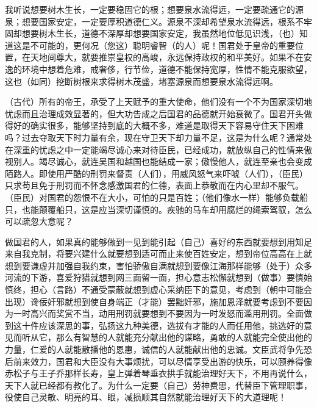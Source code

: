 \documentclass[12pt,UTF-8,openany]{ctexbook}
\begin{document}
\begin{normalsize}
    
    我听说想要树木生长，一定要稳固它的根；想要泉水流得远，一定要疏通它的源泉；想要国家安定，一定要厚积道德仁义。源泉不深却希望泉水流得远，根系不牢固却想要树木生长，道德不深厚却想要国家安定，我虽然地位低见识浅，（也）知道这是不可能的，更何况（您这）聪明睿智（的人）呢！国君处于皇帝的重要位置，在天地间尊大，就要推崇皇权的高峻，永远保持政权的和平美好。如果不在安逸的环境中想着危难，戒奢侈，行节俭，道德不能保持宽厚，性情不能克服欲望，这也（如同）挖断树根来求得树木茂盛，堵塞源泉而想要泉水流得远啊。
    
    （古代）所有的帝王，承受了上天赋予的重大使命，他们没有一个不为国家深切地忧虑而且治理成效显著的，但大功告成之后国君的品德就开始衰微了。国君开头做得好的确实很多，能够坚持到底的大概不多，难道是取得天下容易守住天下困难吗？过去夺取天下时力量有余，现在守卫天下却力量不足，这是为什么呢？通常处在深重的忧虑之中一定能竭尽诚心来对待臣民，已经成功，就放纵自己的性情来傲视别人。竭尽诚心，就连吴国和越国也能结成一家；傲慢他人，就连至亲也会变成陌路人。即使用严酷的刑罚来督责（人们），用威风怒气来吓唬（人们），（臣民）只求苟且免于刑罚而不怀念感激国君的仁德，表面上恭敬而在内心里却不服气。（臣民）对国君的怨恨不在大小，可怕的只是百姓；（他们像水一样）能够负载船只，也能颠覆船只，这是应当深切谨慎的。疾驰的马车却用腐烂的绳索驾驭，怎么可以疏忽大意呢？
    
    做国君的人，如果真的能够做到一见到能引起（自己）喜好的东西就要想到用知足来自我克制，将要兴建什么就要想到适可而止来使百姓安定，想到帝位高高在上就想到要谦虚并加强自我约束，害怕骄傲自满就想到要像江海那样能够（处于）众多河流的下游，喜爱狩猎就想到网三面留一面，担心意志松懈就想到（做事）要慎始慎终，担心（言路）不通受蒙蔽就想到虚心采纳臣下的意见，考虑到（朝中可能会出现）谗佞奸邪就想到使自身端正（才能）罢黜奸邪，施加恩泽就要考虑到不要因为一时高兴而奖赏不当，动用刑罚就要想到不要因为一时发怒而滥用刑罚。全面做到这十件应该深思的事，弘扬这九种美德，选拔有才能的人而任用他，挑选好的意见而听从它，那么有智慧的人就能充分献出他的谋略，勇敢的人就能完全使出他的力量，仁爱的人就能散播他的恩惠，诚信的人就能献出他的忠诚。文臣武将争先恐后前来效力，国君和大臣没有大事烦扰，可以尽情享受出游的快乐，可以颐养得像赤松子与王子乔那样长寿，皇上弹着琴垂衣拱手就能治理好天下，不用再说什么，天下人就已经都有教化了。为什么一定要（自己）劳神费思，代替臣下管理职事，役使自己灵敏、明亮的耳、眼，减损顺其自然就能治理好天下的大道理呢！
    
\end{normalsize}


\newpage
\end{document}

